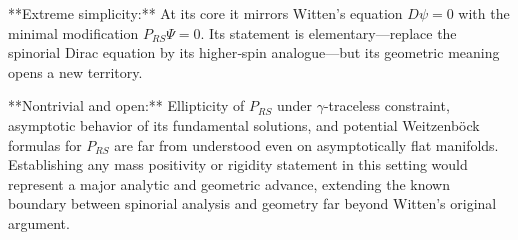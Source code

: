 **Extreme simplicity:**  
At its core it mirrors Witten’s equation \(D\psi=0\) with the minimal modification \(P_{RS}\Psi=0\).  Its statement is elementary—replace the spinorial Dirac equation by its higher‑spin analogue—but its geometric meaning opens a new territory.

**Nontrivial and open:**  
Ellipticity of \(P_{RS}\) under \(\gamma\)-traceless constraint, asymptotic behavior of its fundamental solutions, and potential Weitzenböck formulas for \(P_{RS}\) are far from understood even on asymptotically flat manifolds. Establishing any mass positivity or rigidity statement in this setting would represent a major analytic and geometric advance, extending the known boundary between spinorial analysis and geometry far beyond Witten’s original argument.